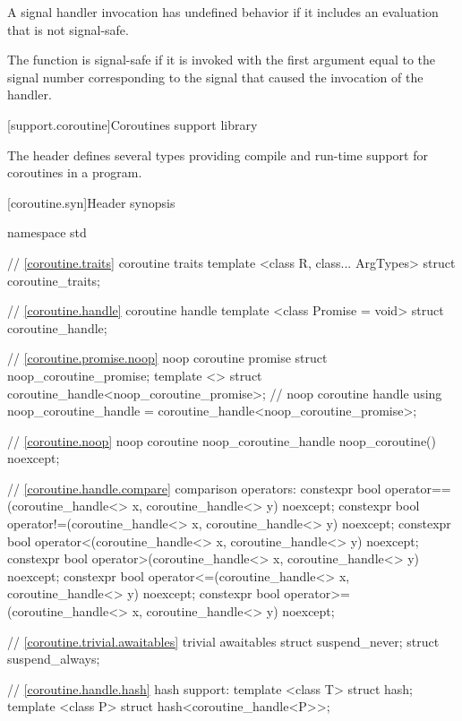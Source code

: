 A signal handler invocation has undefined behavior if it includes
an evaluation that is not signal-safe.

\pnum
{}%
The function  is signal-safe if it is invoked
with the first argument equal to the signal number
corresponding to the signal that caused the invocation of the handler.


[support.coroutine]{Coroutines support library}

\pnum
The header
defines several types providing compile and run-time support for coroutines in a \Cpp program.

[coroutine.syn]{Header  synopsis}

%
%
\begin{codeblock}
namespace std {
  // \ref{coroutine.traits} coroutine traits
  template <class R, class... ArgTypes>
    struct coroutine_traits;
  	
  // \ref{coroutine.handle} coroutine handle
  template <class Promise = void>
    struct coroutine_handle;		
  
  // \ref{coroutine.promise.noop} noop coroutine promise
  struct noop_coroutine_promise;
  template <> struct coroutine_handle<noop_coroutine_promise>;
  // noop coroutine handle
  using noop_coroutine_handle = coroutine_handle<noop_coroutine_promise>;
  
  // \ref{coroutine.noop} noop coroutine
  noop_coroutine_handle noop_coroutine() noexcept;

  // \ref{coroutine.handle.compare} comparison operators:	
  constexpr bool operator==(coroutine_handle<> x, coroutine_handle<> y) noexcept;
  constexpr bool operator!=(coroutine_handle<> x, coroutine_handle<> y) noexcept;
  constexpr bool operator<(coroutine_handle<> x, coroutine_handle<> y) noexcept;			
  constexpr bool operator>(coroutine_handle<> x, coroutine_handle<> y) noexcept;
  constexpr bool operator<=(coroutine_handle<> x, coroutine_handle<> y) noexcept;			
  constexpr bool operator>=(coroutine_handle<> x, coroutine_handle<> y) noexcept;
    
  // \ref{coroutine.trivial.awaitables} trivial awaitables
  struct suspend_never;
  struct suspend_always;

  // \ref{coroutine.handle.hash} hash support:
  template <class T> struct hash;
  template <class P> struct hash<coroutine_handle<P>>;
}
\end{codeblock}

